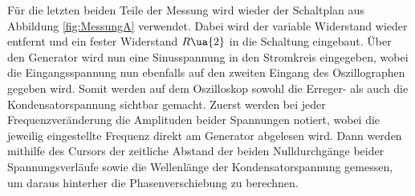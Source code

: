 Für die letzten beiden Teile der Messung wird wieder der Schaltplan aus Abbildung
\ref{fig:MessungA} verwendet. Dabei wird der variable Widerstand wieder entfernt
und ein fester Widerstand $R\ua{2}$ in die Schaltung eingebaut. Über den Generator
wird nun eine Sinusspannung in den Stromkreis eingegeben, wobei die Eingangsspannung
nun ebenfalls auf den zweiten Eingang des Oszillographen gegeben wird.
Somit werden auf dem Oszilloskop sowohl die Erreger- als auch die Kondensatorspannung
sichtbar gemacht. Zuerst werden bei jeder Frequenzveränderung die Amplituden beider
Spannungen notiert, wobei die jeweilig eingestellte Frequenz direkt am Generator
abgelesen wird. Dann werden mithilfe des Cursors der zeitliche Abstand der beiden
Nulldurchgänge beider Spannungsverläufe sowie die Wellenlänge der Kondensatorspannung
gemessen, um daraus hinterher die Phasenverschiebung zu berechnen.


\newpage



\printbibliography


